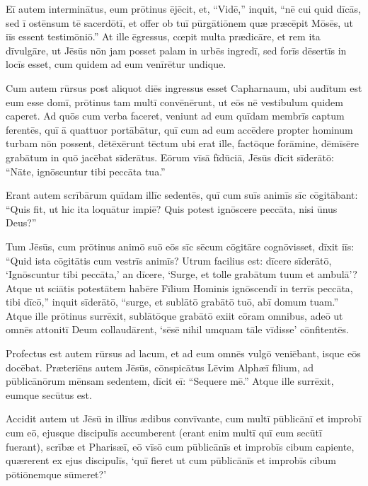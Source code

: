\Versus Eī autem interminātus, eum prōtinus ējēcit,
\Versus et, ``Vidē,'' inquit, ``nē cui quid dīcās, sed ī ostēnsum tē sacerdōtī, et offer ob tuī pūrgātiōnem quæ præcēpit Mōsēs, ut iīs essent testimōniō.''
\Versus At ille ēgressus, cœpit multa prædicāre, et rem ita dīvulgāre, ut Jēsūs nōn jam posset palam in urbēs ingredī, sed forīs dēsertīs in locīs esset, cum quidem ad eum venīrētur undique.



\Caput
\Versus Cum autem rūrsus post aliquot diēs ingressus esset Capharnaum,
\Versus ubi audītum est eum esse domī, prōtinus tam multī convēnērunt, ut eōs nē vestibulum quidem caperet.
\Versus Ad quōs cum verba faceret, veniunt ad eum quīdam membrīs captum ferentēs, quī ā quattuor portābātur,
\Versus quī cum ad eum accēdere propter hominum turbam nōn possent, dētēxērunt tēctum ubi erat ille, factōque forāmine, dēmīsēre grabātum in quō jacēbat sīderātus.
\Versus Eōrum vīsā fīdūciā, Jēsūs dīcit sīderātō: ``Nāte, ignōscuntur tibi peccāta tua.''

\Versus Erant autem scrībārum quīdam illīc sedentēs, quī cum suīs animīs sīc cōgitābant:
\Versus ``Quis fit, ut hic ita loquātur impiē? Quis potest ignōscere peccāta, nisi ūnus Deus?''

\Versus Tum Jēsūs, cum prōtinus animō suō eōs sīc sēcum cōgitāre cognōvisset, dīxit iīs: ``Quid ista cōgitātis cum vestrīs animīs?
\Versus Utrum facilius est: dīcere sīderātō, `Ignōscuntur tibi peccāta,' an dīcere, `Surge, et tolle grabātum tuum et ambulā'?
\Versus Atque ut sciātis potestātem habēre Fīlium Hominis ignōscendī in terrīs peccāta,
\Versus tibi dīcō,'' inquit sīderātō, ``surge, et sublātō grabātō tuō, abī domum tuam.''
\Versus Atque ille prōtinus surrēxit, sublātōque grabātō exiit cōram omnibus, adeō ut omnēs attonitī Deum collaudārent, `sēsē nihil umquam tāle vīdisse' cōnfitentēs.

\Versus Profectus est autem rūrsus ad lacum, et ad eum omnēs vulgō veniēbant, isque eōs docēbat.
\Versus Præteriēns autem Jēsūs, cōnspicātus Lēvim Alphæī fīlium, ad pūblicānōrum mēnsam sedentem, dīcit eī: ``Sequere mē.'' Atque ille surrēxit, eumque secūtus est.

\Versus Accidit autem ut Jēsū in illīus ædibus convīvante, cum multī pūblicānī et improbī cum eō, ejusque discipulīs accumberent (erant enim multī quī eum secūtī fuerant),
\Versus scrībæ et Pharisæī, eō vīsō cum pūblicānīs et improbīs cibum capiente, quærerent ex ejus discipulīs, `quī fieret ut cum pūblicānīs et improbīs cibum pōtiōnemque sūmeret?'

